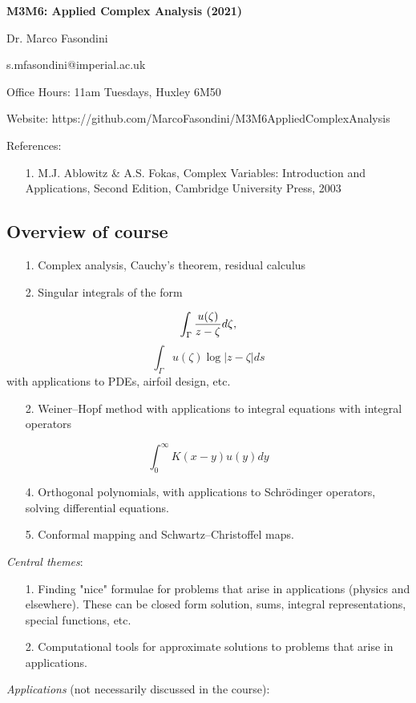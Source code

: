 \documentclass[12pt,a4paper]{article}
\def\endash{–}
\begin{document}
\textbf{M3M6: Applied Complex Analysis (2021)}

Dr. Marco Fasondini

s.mfasondini@imperial.ac.uk

Office Hours: 11am Tuesdays, Huxley 6M50

Website: https://github.com/MarcoFasondini/M3M6AppliedComplexAnalysis

References:

\begin{itemize}
\item[1. ] M.J. Ablowitz \& A.S. Fokas, Complex Variables: Introduction and Applications, Second Edition, Cambridge University Press, 2003

\end{itemize}
\subsection{Overview of course}
\begin{itemize}
\item[1. ] Complex analysis, Cauchy's theorem, residual calculus


\item[2. ] Singular integrals of the form

\end{itemize}
\[
\int_\Gamma {u(\zeta) \over z - \zeta}  d\zeta,
\]
\[
\int_\Gamma u(\zeta) \log|z - \zeta|  ds
\]
with applications to PDEs, airfoil design, etc.

\begin{itemize}
\item[2. ] Weiner\ensuremath{\endash}Hopf method with applications to integral equations with integral operators

\end{itemize}
\[
\int_0^\infty K(x-y) u(y)  dy
\]
\begin{itemize}
\item[4. ] Orthogonal polynomials, with applications to Schrödinger operators, solving differential equations.


\item[5. ] Conformal mapping and Schwartz\ensuremath{\endash}Christoffel maps.

\end{itemize}
\emph{Central themes}:

\begin{itemize}
\item[1. ] Finding "nice" formulae for problems that arise in applications (physics and elsewhere). These can be closed form solution, sums, integral representations, special functions, etc.


\item[2. ] Computational tools for approximate solutions to problems that arise in applications.

\end{itemize}
\emph{Applications} (not necessarily discussed in the course):
\end{document}
